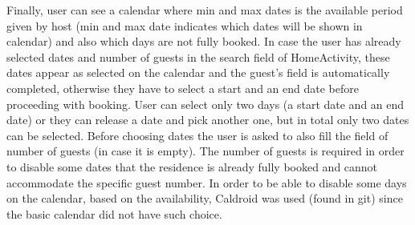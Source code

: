 \documentclass[12pt]{article}
\begin{document}
	Finally, user can see a calendar where min and max dates is the available period given by host (min and max date indicates which dates will be shown in calendar) and also which days are not fully booked. In case the user has already selected dates and number of guests in the search field of HomeActivity, these dates appear as selected on the calendar and the guest's field is automatically completed, otherwise they have to select a start and an end date before proceeding with booking. User can select only two days (a start date and an end date) or they can release a date and pick another one, but in total only two dates can be selected. Before choosing dates the user is asked to also fill the field of number of guests (in case it is empty). The number of guests is required in order to disable some dates that the residence is already fully booked and cannot accommodate the specific guest number. In order to be able to disable some days on the calendar, based on the availability, Caldroid was used (found in git) since the basic calendar did not have such choice.
	
\end{document}
